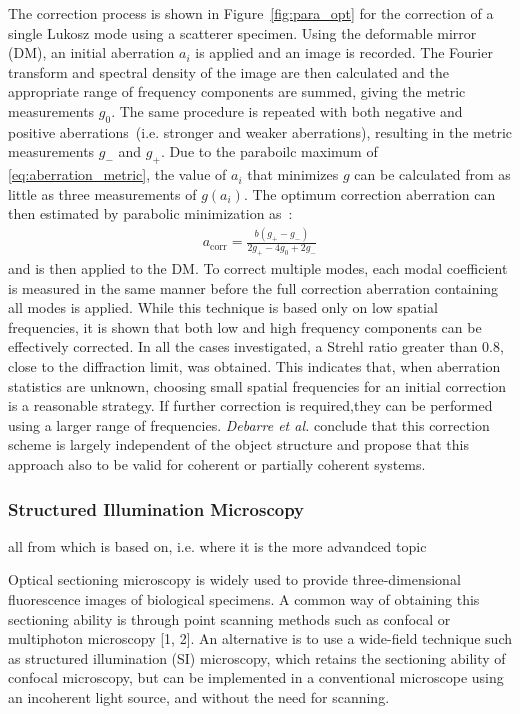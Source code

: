 The correction process is shown in Figure~\ref{fig:para_opt} for the correction of a single Lukosz mode using a scatterer specimen. Using the deformable mirror (DM), an initial aberration $a_i$ is applied and an image is recorded. The Fourier transform and spectral density of the image are then calculated and the appropriate range of frequency components are summed, giving the metric measurements $g_0$. The same procedure is repeated with both negative and positive aberrations~(i.e. stronger and weaker aberrations), resulting in the metric measurements $g_-$ and  $g_+$. Due to the paraboilc maximum of \eqref{eq:aberration_metric}, the value of $a_i$ that minimizes $g$ can be calculated from as little as three measurements of $g(a_i)$. The optimum correction aberration can then estimated by parabolic minimization as~\cite{wide_parabolic_optimization}:
\begin{align}
	a_\text{corr} = \frac{b(g_+ - g_-)}{2g_+ - 4g_0 + 2g_-}
\end{align}
and is then applied to the DM. To correct multiple modes, each modal coefficient is measured in the same manner before the full correction aberration containing all modes is applied. While this technique is based only on low spatial frequencies, it is shown that both low and high frequency components can be effectively corrected. In all the cases investigated, a Strehl ratio greater than 0.8, close to the diffraction limit, was obtained. This indicates that, when aberration statistics are unknown, choosing small spatial frequencies for an initial correction is a reasonable strategy. If further correction is required,they can be performed using a larger range of frequencies. \emph{Debarre et al.} conclude that this correction scheme is largely independent of the object structure and propose that this approach also to be valid for coherent or partially coherent systems.


\subsubsection{Structured Illumination Microscopy}
\label{sec:StructuredIlluminationMicroscopy}

\cite{wide_AOM_structured_illu}

all from \cite{wide_AOM_loew_freq} which \cite{wide_AOM_structured_illu} is based on, i.e. where it is the more advandced topic

Optical sectioning microscopy is widely used to provide three-dimensional 
fluorescence images of biological specimens. A common way of obtaining this 
sectioning ability is through point scanning methods such as confocal or 
multiphoton microscopy [1, 2]. An alternative is to use a wide-field 
technique such as structured illumination (SI) microscopy, which retains the 
sectioning ability of confocal microscopy, but can be implemented in a 
conventional microscope using an incoherent light source, and without the 
need for scanning. 

